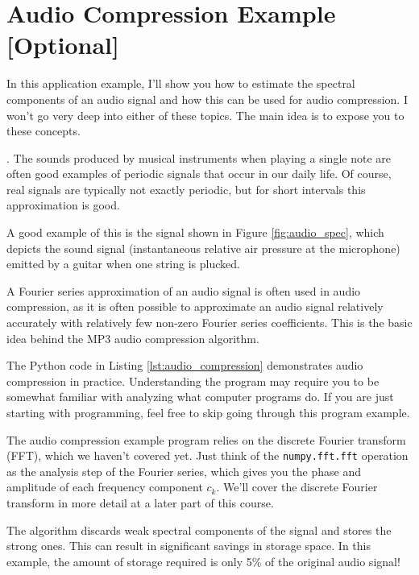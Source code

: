 \newpage
\section{Audio Compression Example [Optional]}
In this application example, I'll show you how to estimate the
spectral components of an audio signal and how this can be used for
audio compression. I won't go very deep into either of these
topics. The main idea is to expose you to these concepts.

.  The sounds produced by musical
instruments when playing a single note are often good examples of
periodic signals that occur in our daily life. Of course, real signals
are typically not exactly periodic, but for short intervals this
approximation is good.

A good example of this is the signal shown in
Figure \ref{fig:audio_spec}, which depicts the sound signal (instantaneous
relative air pressure at the microphone) emitted by a guitar when one
string is plucked.

A Fourier series approximation of an audio signal is often used in
audio compression, as it is often possible to approximate an audio
signal relatively accurately with relatively few non-zero Fourier
series coefficients. This is the basic idea behind the MP3 audio
compression algorithm.

The Python code in Listing \ref{lst:audio_compression} demonstrates
audio compression in practice. Understanding the program may require
you to be somewhat familiar with analyzing what computer programs
do. If you are just starting with programming, feel free to skip going
through this program example.

The audio compression example program relies on the discrete Fourier
transform (FFT), which we haven't covered yet. Just think of
the \verb|numpy.fft.fft| operation as the analysis step of the Fourier
series, which gives you the phase and amplitude of each frequency
component $c_k$. We'll cover the discrete Fourier transform in more
detail at a later part of this course.



The algorithm discards weak spectral components of the signal and
stores the strong ones. This can result in significant savings in
storage space. In this example, the amount of storage required is only
5\% of the original audio signal!


